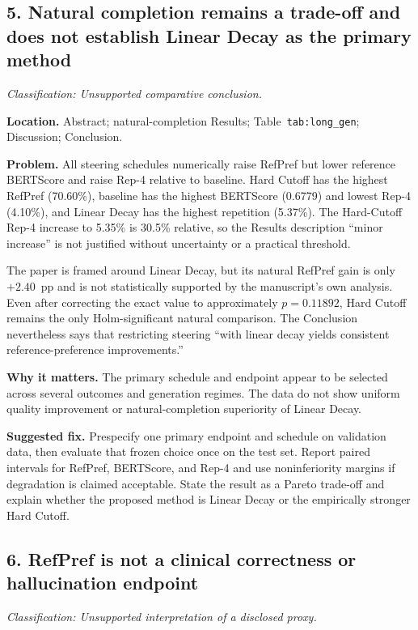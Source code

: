 \documentclass[11pt]{article}
\newcommand{\findinglabel}[1]{\textbf{#1}}
\newcommand{\classification}[1]{\textit{Classification: #1.}}
\begin{document}
\subsection*{5. Natural completion remains a trade-off and does not establish Linear Decay as the primary method}

\classification{Unsupported comparative conclusion}

\findinglabel{Location.} Abstract; natural-completion Results; Table~\texttt{tab:long\_gen}; Discussion; Conclusion.

\findinglabel{Problem.} All steering schedules numerically raise RefPref but lower reference BERTScore and raise Rep-4 relative to baseline.  Hard Cutoff has the highest RefPref (70.60\%), baseline has the highest BERTScore (0.6779) and lowest Rep-4 (4.10\%), and Linear Decay has the highest repetition (5.37\%).  The Hard-Cutoff Rep-4 increase to 5.35\% is 30.5\% relative, so the Results description ``minor increase'' is not justified without uncertainty or a practical threshold.

The paper is framed around Linear Decay, but its natural RefPref gain is only $+2.40$~pp and is not statistically supported by the manuscript's own analysis.  Even after correcting the exact value to approximately $p=0.11892$, Hard Cutoff remains the only Holm-significant natural comparison.  The Conclusion nevertheless says that restricting steering ``with linear decay yields consistent reference-preference improvements.''

\findinglabel{Why it matters.} The primary schedule and endpoint appear to be selected across several outcomes and generation regimes.  The data do not show uniform quality improvement or natural-completion superiority of Linear Decay.

\findinglabel{Suggested fix.} Prespecify one primary endpoint and schedule on validation data, then evaluate that frozen choice once on the test set.  Report paired intervals for RefPref, BERTScore, and Rep-4 and use noninferiority margins if degradation is claimed acceptable.  State the result as a Pareto trade-off and explain whether the proposed method is Linear Decay or the empirically stronger Hard Cutoff.

\subsection*{6. RefPref is not a clinical correctness or hallucination endpoint}

\classification{Unsupported interpretation of a disclosed proxy}
\end{document}
